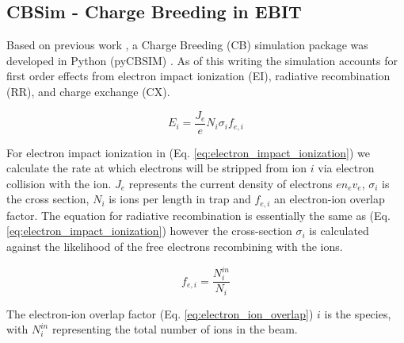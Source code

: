 \documentclass[jon_ringuette_thesis_proposal.tex]{subfiles}
\begin{document}
    \subsection{\label{cbsim_simulations}CBSim - Charge Breeding in EBIT}
    Based on previous work \cite{Macdonald2014},\cite{Currell2005} a Charge Breeding (CB) simulation package was developed in Python (pyCBSIM) \cite{pyCBSIM}.
    As of this writing the simulation accounts for first order effects from electron impact ionization (EI), radiative recombination (RR), and charge exchange (CX).

    \begin{equation}
        E_i = \frac{J_e}{e}  N_{i}  \sigma_{i}  f_{e, i}
        \label{eq:electron_impact_ionization}
    \end{equation}

    For electron impact ionization in (Eq. \ref{eq:electron_impact_ionization}) we calculate the rate at which electrons will be stripped from ion $i$ via electron collision with the ion. $J_e$ represents the current density of electrons $e n_e v_e$, $\sigma_{i}$ is the cross section, $N_i$ is ions per length in trap and $f_{e, i}$ an electron-ion overlap factor.
    The equation for radiative recombination is essentially the same as (Eq. \ref{eq:electron_impact_ionization}) however the cross-section $\sigma_{i}$ is calculated against the likelihood of the free electrons recombining with the ions.

    \begin{equation}
        f_{e, i} = \frac{N^{in}_{i}}{N_i}
        \label{eq:electron_ion_overlap}
    \end{equation}

    The electron-ion overlap factor (Eq. \ref{eq:electron_ion_overlap}) $i$ is the species, with $N^{in}_{i}$ representing the total number of ions in the beam.
\end{document}
